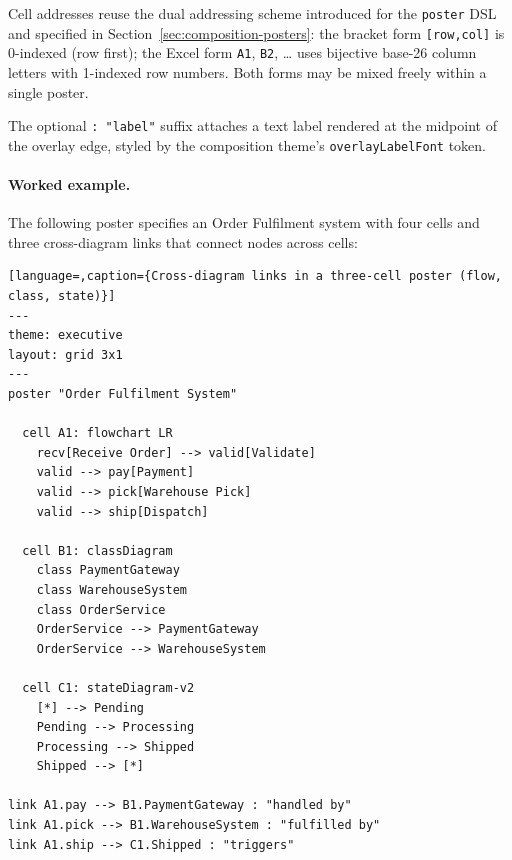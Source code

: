Cell addresses reuse the dual addressing scheme introduced for the
\texttt{poster} DSL and specified in Section~\ref{sec:composition-posters}:
the bracket form \texttt{[row,col]} is 0-indexed (row first); the Excel form
\texttt{A1}, \texttt{B2}, \ldots{} uses bijective base-26 column letters with
1-indexed row numbers.  Both forms may be mixed freely within a single poster.

The optional \texttt{: "label"} suffix attaches a text label rendered at
the midpoint of the overlay edge, styled by the composition theme's
\texttt{overlayLabelFont} token.

\paragraph{Worked example.}

The following poster specifies an Order Fulfilment system with four cells and
three cross-diagram links that connect nodes across cells:

\begin{lstlisting}[language=,caption={Cross-diagram links in a three-cell poster (flow, class, state)}]
---
theme: executive
layout: grid 3x1
---
poster "Order Fulfilment System"

  cell A1: flowchart LR
    recv[Receive Order] --> valid[Validate]
    valid --> pay[Payment]
    valid --> pick[Warehouse Pick]
    valid --> ship[Dispatch]

  cell B1: classDiagram
    class PaymentGateway
    class WarehouseSystem
    class OrderService
    OrderService --> PaymentGateway
    OrderService --> WarehouseSystem

  cell C1: stateDiagram-v2
    [*] --> Pending
    Pending --> Processing
    Processing --> Shipped
    Shipped --> [*]

link A1.pay --> B1.PaymentGateway : "handled by"
link A1.pick --> B1.WarehouseSystem : "fulfilled by"
link A1.ship --> C1.Shipped : "triggers"
\end{lstlisting}


